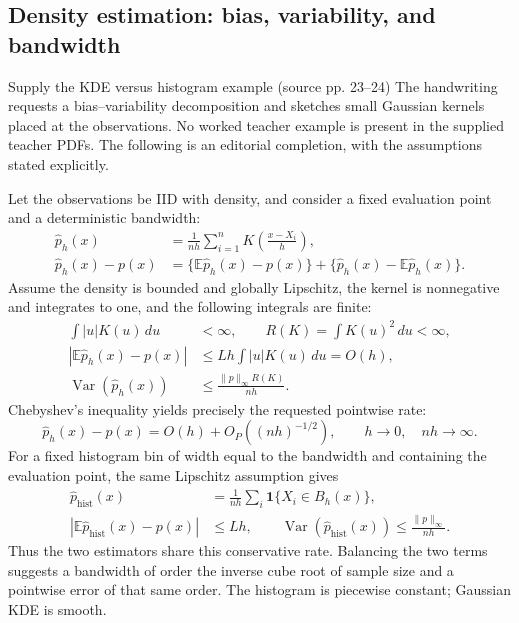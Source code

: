 \documentclass[12pt]{article}
\newcommand{\E}{\mathbb E}
\newcommand{\ind}{\mathbf 1}
\DeclareMathOperator{\Var}{Var}
\begin{document}
\subsection{Density estimation: bias, variability, and bandwidth}
\begin{todobox}{Supply the KDE versus histogram example (source pp. 23--24)}
The handwriting requests a bias--variability decomposition and sketches
small Gaussian kernels placed at the observations. No worked teacher
example is present in the supplied teacher PDFs. The following is an
editorial completion, with the assumptions stated explicitly.
\end{todobox}
Let the observations be IID with density, and consider a fixed evaluation
point and a deterministic bandwidth:
\begin{align}
 \widehat p_h(x)&=\frac1{nh}\sum_{i=1}^n
 K\!\left(\frac{x-X_i}{h}\right),\\
 \widehat p_h(x)-p(x)
 &=\{\E\widehat p_h(x)-p(x)\}
   +\{\widehat p_h(x)-\E\widehat p_h(x)\}.
\end{align}
Assume the density is bounded and globally Lipschitz, the kernel is
nonnegative and integrates to one, and the following integrals are finite:
\begin{align}
 \int |u|K(u)\,du&<\infty,\qquad R(K)=\int K(u)^2\,du<\infty,\\
 |\E\widehat p_h(x)-p(x)|
 &\le Lh\int |u|K(u)\,du=O(h),\\
 \Var(\widehat p_h(x))&\le\frac{\|p\|_\infty R(K)}{nh}.
\end{align}
Chebyshev's inequality yields precisely the requested pointwise rate:
\begin{equation}
 \widehat p_h(x)-p(x)=O(h)+O_P((nh)^{-1/2}),
 \qquad h\to0,\quad nh\to\infty.
\end{equation}
For a fixed histogram bin of width equal to the bandwidth and containing
the evaluation point, the same Lipschitz assumption gives
\begin{align}
 \widehat p_{\mathrm{hist}}(x)&=
 \frac1{nh}\sum_i\ind\{X_i\in B_h(x)\},\\
 |\E\widehat p_{\mathrm{hist}}(x)-p(x)|&\le Lh,\qquad
 \Var(\widehat p_{\mathrm{hist}}(x))\le\frac{\|p\|_\infty}{nh}.
\end{align}
Thus the two estimators share this conservative rate. Balancing the two
terms suggests a bandwidth of order the inverse cube root of sample size
and a pointwise error of that same order. The histogram is piecewise
constant; Gaussian KDE is smooth.
\end{document}
